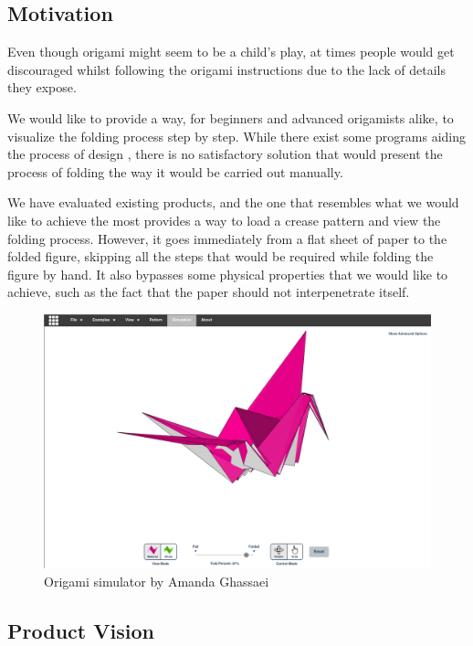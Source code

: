\subsection{Motivation}

Even though origami might seem to be a child's play, at times
people would get discouraged whilst following the origami instructions due to
the lack of details they expose.

We would like to provide a way, for beginners and advanced origamists alike,
to visualize the folding process step by step.
While there exist some programs aiding the process of design \cite{app:treemaker} \cite{app:omto} \cite{app:origami-draw}, there is no satisfactory solution 
that would present the process of folding the way it would be carried out manually.

We have evaluated existing products, and the one that resembles 
what we would like to achieve the most \cite{origami-simulator} provides a way to load a crease pattern
and view the folding process. 
However, it goes immediately from a flat sheet of paper to the folded figure, skipping all the steps
that would be required while folding the figure by hand.
It also bypasses some physical properties that we would like to achieve, such as the fact that the
paper should not interpenetrate itself.


\begin{figure}[H]
\caption{Origami simulator by Amanda Ghassaei}
  \centering
    \includegraphics[width=\textwidth]{assets/origami-simulator.png}
\end{figure}

\clearpage 

\subsection{Product Vision}

